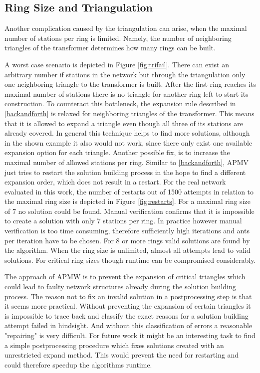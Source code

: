 \subsection{Ring Size and Triangulation}\label{sec:tri_problem}
Another complication caused by the triangulation can arise, when the maximal number of stations per ring is limited. Namely, the number of neighboring triangles of the transformer determines how many rings can be built.

A worst case scenario is depicted in Figure \ref{fig:trifail}. There can exist an arbitrary number if stations in the network but through the triangulation only one neighboring triangle to the transformer is built. After the first ring reaches its maximal number of stations there is no triangle for another ring left to start its construction. To counteract this bottleneck, the expansion rule described in \ref{backandforth} is relaxed for neighboring triangles of the transformer. This means that it is allowed to expand a triangle even though all three of its stations are already covered. In general this technique helps to find more solutions, although in the shown example it also would not work, since there only exist one available expansion option for each triangle. Another possible fix, is to increase the maximal number of allowed stations per ring. Similar to \ref{backandforth}, APMV just tries to restart the solution building process in the hope to find a different expansion order, which does not result in a restart. For the real network evaluated in this work, the number of restarts out of 1500 attempts in relation to the maximal ring size is depicted in Figure \ref{fig:restarts}. For a maximal ring size of 7 no solution could be found. Manual verification confirms that it is impossible to create a solution with only 7 stations per ring. In practice however manual verification is too time consuming, therefore sufficiently high iterations and ants per iteration have to be chosen. For 8 or more rings valid solutions are found by the algorithm. When the ring size is unlimited, almost all attempts lead to valid solutions. For critical ring sizes though runtime can be compromised considerably.


The approach of APMW is to prevent the expansion of critical triangles which could lead to faulty network structures already during the solution building process. The reason not to fix an invalid solution in a postprocessing step is that it seems more practical. Without preventing the expansion of certain triangles it is impossible to trace back and classify the exact reasons for a solution building attempt failed in hindsight. And without this classification of errors a reasonable "repairing" is very difficult. For future work it might be an interesting task to find a simple postprocessing procedure which fixes solutions created with an unrestricted expand method. This would prevent the need for restarting and could therefore speedup the algorithms runtime.

